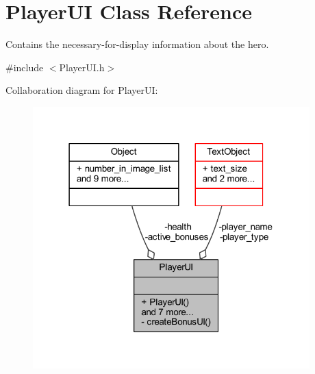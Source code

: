\hypertarget{class_player_u_i}{}\section{Player\+UI Class Reference}
\label{class_player_u_i}


Contains the necessary-\/for-\/display information about the hero.  




{\ttfamily \#include $<$Player\+U\+I.\+h$>$}



Collaboration diagram for Player\+UI\+:\nopagebreak
\begin{figure}[H]
\begin{center}
\leavevmode
\includegraphics[width=303pt]{class_player_u_i__coll__graph}
\end{center}
\end{figure}
